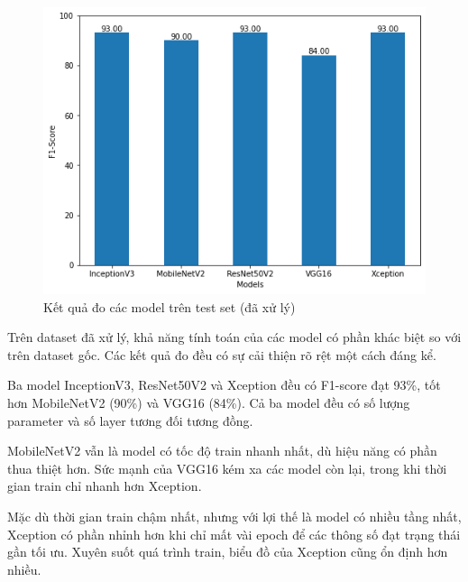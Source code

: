 \documentclass[a4paper,14pt]{extarticle}
\begin{document}
		\begin{figure}[H]
			\centering
			\includegraphics[scale=0.6]{images/processed_score}
			\caption{Kết quả đo các model trên test set (đã xử lý)}
		\end{figure}
		
		Trên dataset đã xử lý, khả năng tính toán của các model có phần khác biệt so với trên dataset gốc. Các kết quả đo đều có sự cải thiện rõ rệt một cách đáng kể.

		Ba model InceptionV3, ResNet50V2 và Xception đều có F1-score đạt 93\%, tốt hơn MobileNetV2 (90\%) và VGG16 (84\%). Cả ba model đều có số lượng parameter và số layer tương đối tương đồng.
		
		MobileNetV2 vẫn là model có tốc độ train nhanh nhất, dù hiệu năng có phần thua thiệt hơn. Sức mạnh của VGG16 kém xa các model còn lại, trong khi thời gian train chỉ nhanh hơn Xception.

		Mặc dù thời gian train chậm nhất, nhưng với lợi thế là model có nhiều tầng nhất, Xception có phần nhỉnh hơn khi chỉ mất vài epoch để các thông số đạt trạng thái gần tối ưu. Xuyên suốt quá trình train, biểu đồ của Xception cũng ổn định hơn nhiều.
\end{document}
